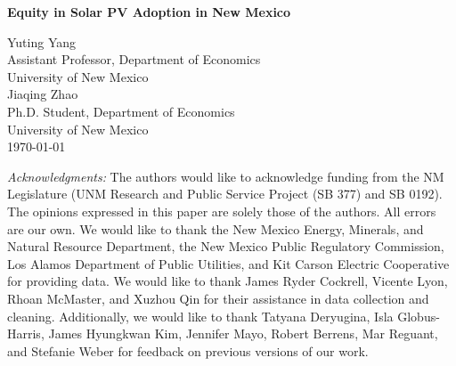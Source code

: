 \begin{titlepage}

\newcommand{\HRule}{\rule{\linewidth}{0.5mm}} 

\begin{center} %



{ \huge \bfseries Equity in Solar PV Adoption in New Mexico}\\ %
\end{center}
\vspace{1.5em}

\begin{center}
    \Large
Yuting Yang\\ %
Assistant Professor, Department of Economics\\
University of New Mexico\\
\vspace{1em}
Jiaqing Zhao\\ %
Ph.D. Student, Department of Economics\\
University of New Mexico\\
\vspace{1.5em}
\today


\vspace{1.5em}
\begin{flushleft}
\normalsize

    \textit{Acknowledgments:} The authors would like to acknowledge funding from the NM Legislature (UNM Research and Public Service Project (SB 377) and SB 0192). The opinions expressed in this paper are solely those of the authors. All errors are our own. We would like to thank the New Mexico Energy, Minerals, and Natural Resource Department, the New Mexico Public Regulatory Commission, Los Alamos Department of Public Utilities, and Kit Carson Electric Cooperative for providing data. We would like to thank James Ryder Cockrell, Vicente Lyon, Rhoan McMaster, and Xuzhou Qin for their assistance in data collection and cleaning. Additionally, we would like to thank Tatyana Deryugina, Isla Globus-Harris, James Hyungkwan Kim, Jennifer Mayo,
    Robert Berrens, 
   Mar Reguant, and Stefanie Weber for feedback on previous versions of our work.  \\


\end{flushleft}
\end{center}
\end{titlepage}
